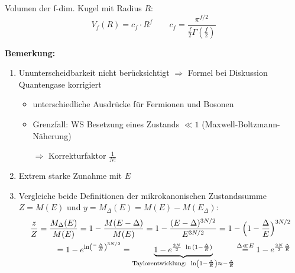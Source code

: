 Volumen der f-dim. Kugel mit Radius $R$:
\begin{equation}
    V_f(R) = c_f \cdot R^f \qquad c_f = \frac{\pi^{f/2}}{\frac{f}{2}\Gamma(\frac{f}{2})}
\end{equation}
\begin{center}
\end{center}
\textbf{Bemerkung:}
\begin{enumerate}
    \item Ununterscheidbarkeit nicht berücksichtigt $\Rightarrow$ Formel bei Diskussion Quantengase korrigiert
    \begin{itemize}
        \item unterschiedliche Ausdrücke für Fermionen und Bosonen
        \item Grenzfall: WS Besetzung eines Zustands $\ll 1$ (Maxwell-Boltzmann-Näherung)
        \item[$\Rightarrow$] Korrekturfaktor $\frac{1}{N!}$ 
    \end{itemize}
    \item Extrem starke Zunahme mit $E$
    \item Vergleiche beide Definitionen der mikrokanonischen Zustandssumme $Z = M(E)$ und $y = M_\Delta (E) = M(E) -M(E_\Delta)$:
    \begin{align}
        \frac{z}{Z} = \frac{M_\Delta(E)}{M(E)} = 1 - \frac{M(E-\Delta)}{M(E)} = 1 -\frac{(E-\Delta)^{3N/2}}{E^{3N/2}} = 1- \Bigl( 1- \frac{\Delta}{E}\Bigr)^{3N/2}  \\
        = 1- e^{\ln(^-\frac{\Delta}{E})^{3N/2}} = \underbrace{1- e^{\frac{3N}{2} \ \ln{(1-\frac{\Delta}{E})}}}_{\text{Taylorentwicklung: } \ln (1-\frac{\Delta}{E}) \approx -\frac{\Delta}{E}} \overset{\Delta \ll E}{=} 1- e^{\frac{3N}{2} \frac{\Delta}{E}}
    \end{align}
\end{enumerate}

